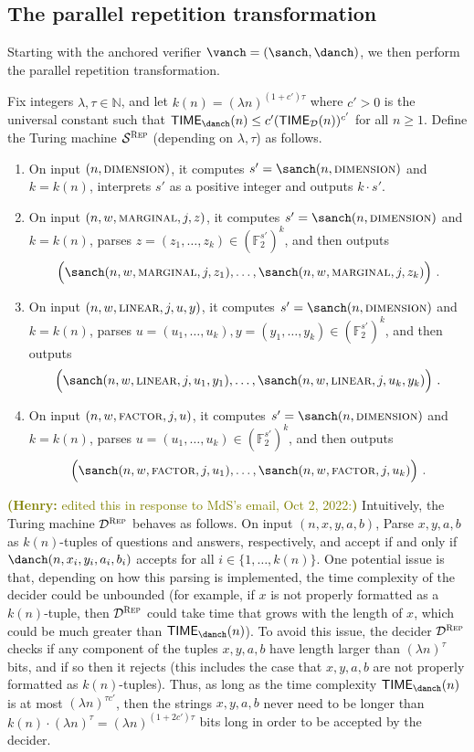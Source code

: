 \documentclass[11pt]{article}
\theoremstyle{definition}
\newcommand{\N}{\ensuremath{\mathbb{N}}}
\newcommand{\F}{\ensuremath{\mathbb{F}}}
\newcommand{\sampler}{\mathcal{S}}
\newcommand{\decider}{\mathcal{D}}
\newcommand{\gamestyle}[1]{\ensuremath{\textsc{#1}}\xspace}
\newcommand{\TIME}{\mathsf{TIME}}
\newcommand{\rep}{\gamestyle{Rep}}
\newcommand{\hnote}[1]{\textcolor{olive}{\small {\textbf{(Henry:} #1\textbf{) }}}}
\newcommand{\hnote}[1]{}
\begin{document}
\subsection{The parallel repetition transformation} 
\label{sec:anchored-repetition}
Starting with the anchored verifier $\vanch = (\sanch,\danch)$, we 
then perform the parallel repetition transformation.

Fix integers $\lambda, \tau \in \N$, and let $k(n) = (\lambda n)^{(1 + c')\tau}$ where $c' >0$ is the universal constant such that $\TIME_{\danch}(n) \leq c'(\TIME_\decider(n))^{c'}$ for all $n \geq 1$. Define the Turing machine $\sampler^\rep$ (depending on $\lambda,\tau$) as follows. 
\begin{enumerate}
	\item On input $(n,\gamestyle{dimension})$, it computes $s' = \sanch(n,\gamestyle{dimension})$ and $k = k(n)$, interprets $s'$ as a positive integer and outputs $k \cdot s'$. 
	\item On input $(n,w,\gamestyle{marginal},j,z)$, it computes $s' = \sanch(n,\gamestyle{dimension})$ and $k = k(n)$, parses $z = (z_1,\ldots,z_k) \in (\F_2^{s'})^k$, and then outputs
	\[
		\Big ( \sanch(n,w,\gamestyle{marginal},j,z_1), \ldots, \sanch(n,w,\gamestyle{marginal},j,z_k)\Big)~.
	\]
	\item On input $(n,w,\gamestyle{linear},j,u,y)$, it computes $s' = \sanch(n,\gamestyle{dimension})$ and $k = k(n)$, parses $u = (u_1,\ldots,u_k), y = (y_1,\ldots,y_k) \in (\F_2^{s'})^k$, and then outputs
	\[
		\Big ( \sanch(n,w,\gamestyle{linear},j,u_1,y_1), \ldots, \sanch(n,w,\gamestyle{linear},j,u_k,y_k)\Big)~.
	\]
	\item On input $(n,w,\gamestyle{factor},j,u)$, it computes $s' = \sanch(n,\gamestyle{dimension})$ and $k = k(n)$, parses $u = (u_1,\ldots,u_k) \in (\F_2^{s'})^k$, and then outputs
	\[
		\Big ( \sanch(n,w,\gamestyle{factor},j,u_1), \ldots, \sanch(n,w,\gamestyle{factor},j,u_k)\Big)~.
	\]
\end{enumerate}
\hnote{edited this in response to MdS's email, Oct 2, 2022:} 
Intuitively, the Turing machine $\decider^\rep$ behaves as follows. On input
$(n,{x},{y},{a},{b})$, Parse $x,y,a,b$ as $k(n)$-tuples of questions and answers, respectively, and accept if and only if $\danch(n,x_i,y_i,a_i,b_i)$
accepts for all $i \in \{ 1,\ldots,k(n) \}$. One potential issue is that, depending on how this parsing is implemented, the time complexity of the decider could be unbounded (for example, if $x$ is not properly formatted as a $k(n)$-tuple, then $\decider^\rep$ could take time that grows with the length of $x$, which could be much greater than $\TIME_{\danch}(n)$). To avoid this issue, the decider $\decider^\rep$ checks if any component of the tuples $x,y,a,b$ have length larger than $(\lambda n)^\tau$ bits, and if so then it rejects (this includes the case that $x,y,a,b$ are not properly formatted as $k(n)$-tuples). 
Thus, as long as the time complexity $\TIME_\danch(n)$ is at most $(\lambda n)^{\tau c'}$, then the strings $x,y,a,b$ never need to be longer than $k(n) \cdot (\lambda n)^\tau = (\lambda n)^{(1 + 2c')\tau}$ bits long in order to be accepted by the decider.
\end{document}
